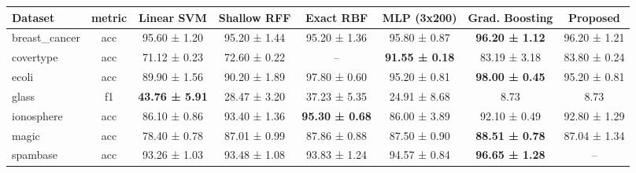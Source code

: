 \begin{tabular}{lccccccc}
\toprule
Dataset & metric & Linear SVM & Shallow RFF & Exact RBF & MLP (3x200) & Grad. Boosting & Proposed \\
\midrule
breast_cancer & acc & 95.60 ± 1.20 & 95.20 ± 1.44 & 95.20 ± 1.36 & 95.80 ± 0.87 & \textbf{96.20 ± 1.12} & 96.20 ± 1.21 \\
covertype & acc & 71.12 ± 0.23 & 72.60 ± 0.22 & -- & \textbf{91.55 ± 0.18} & 83.19 ± 3.18 & 83.80 ± 0.24 \\
ecoli & acc & 89.90 ± 1.56 & 90.20 ± 1.89 & 97.80 ± 0.60 & 95.20 ± 0.81 & \textbf{98.00 ± 0.45} & 95.20 ± 0.81 \\
glass & f1 & \textbf{43.76 ± 5.91} & 28.47 ± 3.20 & 37.23 ± 5.35 & 24.91 ± 8.68 &  8.73 &  8.73 \\
ionosphere & acc & 86.10 ± 0.86 & 93.40 ± 1.36 & \textbf{95.30 ± 0.68} & 86.00 ± 3.89 & 92.10 ± 0.49 & 92.80 ± 1.29 \\
magic & acc & 78.40 ± 0.78 & 87.01 ± 0.99 & 87.86 ± 0.88 & 87.50 ± 0.90 & \textbf{88.51 ± 0.78} & 87.04 ± 1.34 \\
spambase & acc & 93.26 ± 1.03 & 93.48 ± 1.08 & 93.83 ± 1.24 & 94.57 ± 0.84 & \textbf{96.65 ± 1.28} & -- \\
\bottomrule
\end{tabular}
